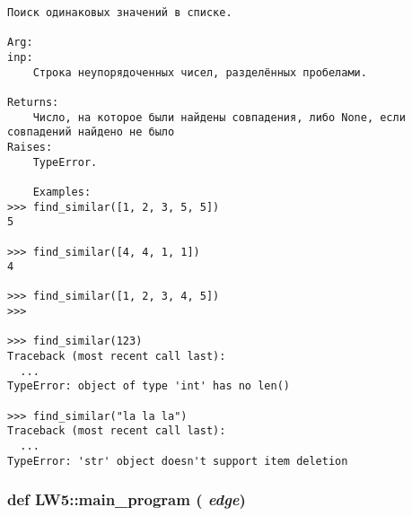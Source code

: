\footnotesize\begin{verbatim}
Поиск одинаковых значений в списке.

Arg:
inp:
    Строка неупорядоченных чисел, разделённых пробелами.

Returns:
    Число, на которое были найдены совпадения, либо None, если совпадений найдено не было
Raises:
    TypeError.

    Examples:
>>> find_similar([1, 2, 3, 5, 5])
5

>>> find_similar([4, 4, 1, 1])
4

>>> find_similar([1, 2, 3, 4, 5])
>>>

>>> find_similar(123)
Traceback (most recent call last):
  ...
TypeError: object of type 'int' has no len()

>>> find_similar("la la la")
Traceback (most recent call last):
  ...
TypeError: 'str' object doesn't support item deletion

\end{verbatim}
\normalsize
 \hypertarget{namespace_l_w5_f4d62490e315452ac8f09431ecebc77d}{
\subsubsection[{main\_\-program}]{\setlength{\rightskip}{0pt plus 5cm}def LW5::main\_\-program ( {\em edge})}}
\label{namespace_l_w5_f4d62490e315452ac8f09431ecebc77d}




